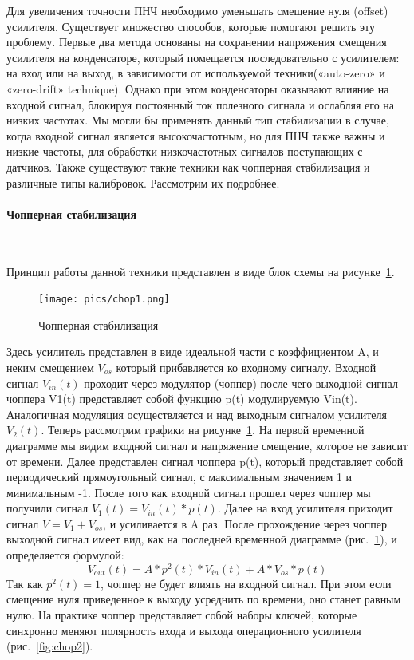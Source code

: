 \documentclass[a4paper,12pt,oneside]{scrartcl}
\begin{document}
Для увеличения точности ПНЧ необходимо уменьшать смещение нуля (offset) усилителя. Существует множество способов, которые помогают решить эту проблему. Первые два метода основаны на сохранении напряжения смещения усилителя на конденсаторе, который помещается последовательно с усилителем: на вход или на выход, в зависимости от используемой техники(«auto-zero» и «zero-drift» technique). Однако при этом конденсаторы оказывают влияние на входной сигнал, блокируя постоянный ток полезного сигнала и ослабляя его на низких частотах. Мы могли бы применять данный тип стабилизации в случае, когда входной сигнал является высокочастотным, но для ПНЧ также важны и низкие частоты, для обработки низкочастотных сигналов поступающих с датчиков. Также существуют такие техники как чопперная стабилизация и различные типы калибровок. Рассмотрим их подробнее.~\cite{B12}






\paragraph{Чопперная стабилизация}~~~~~~~~~~~~~~~~~~~~~~~~~~~~~

Принцип работы данной техники представлен в виде блок схемы на рисунке~\ref{fig:chop1}.

\begin{figure}[!htb]
\centering
\texttt{[image: pics/chop1.png]}
\caption{Чопперная стабилизация}
\label{fig:chop1}
\end{figure}
\FloatBarrier

Здесь усилитель представлен в виде идеальной части с коэффициентом A, и неким смещением $V_{os}$ который прибавляется ко входному сигналу. Входной сигнал $V_{in}(t)$ проходит через модулятор (чоппер) после чего выходной сигнал чоппера V1(t) представляет собой функцию p(t) модулируемую Vin(t). Аналогичная модуляция осуществляется и над выходным сигналом усилителя $V_{2}(t)$. Теперь рассмотрим графики на рисунке~\ref{fig:chop1}. На первой временной диаграмме мы видим входной сигнал и напряжение смещение, которое не зависит от времени. Далее представлен сигнал чоппера p(t), который представляет собой периодический прямоугольный сигнал, с максимальным значением 1 и минимальным -1. После того как входной сигнал прошел через чоппер мы получили сигнал $V_{1}(t) = V_{in}(t) * p(t)$. Далее на вход усилителя приходит сигнал $V = V_{1} + V_{os}$, и усиливается в A раз. После прохождение через чоппер выходной сигнал имеет вид, как на последней временной диаграмме (рис.~\ref{fig:chop1}), и определяется формулой:
$$V_{out}(t) = A * p^2(t) * V_{in}(t) + A * V_{os} * p(t)$$
Так как $p^2(t) = 1$, чоппер не будет влиять на входной сигнал. При этом если смещение нуля приведенное к выходу усреднить по времени, оно станет равным нулю.
На практике чоппер представляет собой наборы ключей, которые синхронно меняют полярность входа и выхода операционного усилителя (рис.~\ref{fig:chop2}).~\cite{B10}
\end{document}
